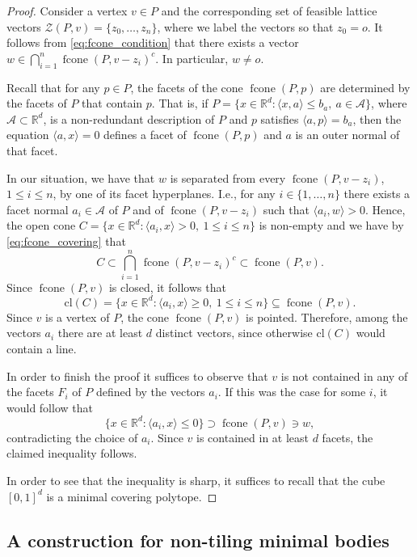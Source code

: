 \documentclass[11pt, a4paper]{amsart}
\newcommand{\orbit}{\mathcal{Z}}
\newcommand{\RR}{\mathbb{R}}
\newcommand{\cl}{\mathrm{cl}}
\DeclareMathOperator{\fcone}{fcone}
\newcommand{\origin}{o}
\numberwithin{equation}{section}
\theoremstyle{plain}
\begin{document}
\begin{proof}
Consider a vertex $v\in P$ and the corresponding set of feasible lattice vectors $\orbit(P,v) = \{z_0,\dots,z_n\}$, where we label the vectors so that $z_0 = \origin$. It follows from \eqref{eq:fcone_condition} that there exists a vector $w\in \bigcap_{i=1}^n \fcone(P,v-z_i)^c$. In particular, $w\neq \origin$.

Recall that for any $p\in P$, the facets of the cone $\fcone(P,p)$ are determined by the facets of $P$ that contain $p$. That is, if $P = \{ x\in\RR^d : \langle x,a\rangle\leq b_a,~a\in\mathcal A\}$, where $\mathcal A\subset\RR^d$, is a non-redundant description of $P$ and $p$ satisfies $\langle a,p\rangle = b_a$, then the equation $\langle a,x\rangle = 0$ defines a facet of $\fcone(P,p)$ and $a$ is an outer normal of that facet.

In our situation, we have that $w$ is separated from every $\fcone(P,v-z_i)$, $1\leq i \leq n$, by one of its facet hyperplanes. I.e., for any $i\in\{1,\dots,n\}$ there exists a facet normal $a_i\in\mathcal A$ of $P$ and of $\fcone(P,v-z_i)$ such that $\langle a_i,w\rangle > 0$. Hence, the open cone $C = \{x\in\RR^d : \langle a_i,x\rangle > 0,~1\leq i \leq n\}$ is non-empty and we have by \eqref{eq:fcone_covering} that
\[
C \subset \bigcap_{i=1}^n \fcone(P,v-z_i)^c \subset \fcone(P,v).
\]
Since $\fcone(P,v)$ is closed, it follows that \[
\cl(C) = \{ x\in\RR^d : \langle a_i,x\rangle \geq 0,~1\leq i \leq n\}\subseteq \fcone(P,v).
\]
Since $v$ is a vertex of $P$, the cone $\fcone(P,v)$ is pointed. Therefore, among the vectors $a_i$ there are at least $d$ distinct vectors, since otherwise $\cl(C)$ would contain a line.

In order to finish the proof it suffices to observe that $v$ is not contained in any of the facets $F_i$ of $P$ defined by the vectors $a_i$. If this was the case for some $i$, it would follow that
\[
\{x\in\RR^d : \langle a_i,x\rangle \leq 0 \}\supset \fcone(P,v) \ni w,
\]
contradicting the choice of $a_i$. Since $v$ is contained in at least $d$ facets, the claimed inequality follows.

In order to see that the inequality is sharp, it suffices to recall that the cube $[0,1]^d$ is a minimal covering polytope.
\end{proof}





\subsection{A construction for non-tiling minimal bodies}
\label{sec:nontile}
\end{document}
